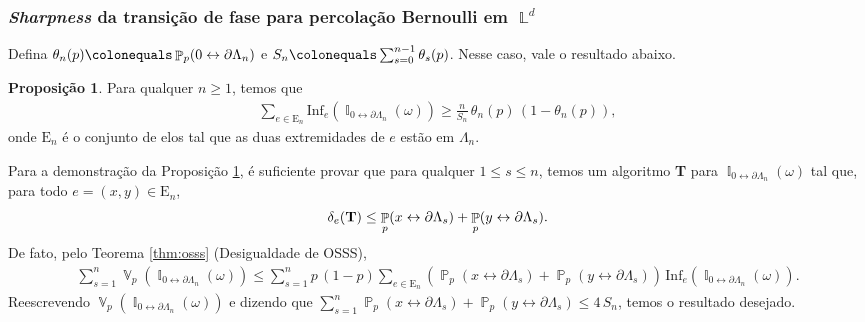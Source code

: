 \documentclass[9pt]{beamer}
\theoremstyle{definition} %
\newtheorem{mypro}{Proposição}
\DeclareMathOperator{\PX}{\mathbb{P}} %
\DeclareMathOperator{\VX}{\mathbb{V}} %
\DeclareMathOperator{\IX}{\mathbb{I}} %
\DeclareMathOperator{\LX}{\mathbb{L}} %
\begin{document}
	\begin{frame}[t]
		\frametitle{\textit{Sharpness} da transição de fase para percolação Bernoulli em $\LX^d$}
		Defina $\theta_n(p) \colonequals \PX_p(0 \leftrightarrow \partial\Lambda_n)$ e $S_n \colonequals \sum_{s = 0}^{n-1}\theta_s(p)$. Nesse caso, vale o resultado abaixo.
		\begin{mypro}\label{prop:decai-exp}
			Para qualquer $n \geq 1$, temos que
			\begin{align*}
			\sum_{e \in \text{E}_n} \text{Inf}_e(\IX_{0\leftrightarrow\partial\Lambda_n}(\omega)) \geq \frac{n}{S_n} \, \theta_n(p) \, (1 - \theta_n(p)),
			\end{align*}
			onde $\text{E}_n$ é o conjunto de elos tal que as duas extremidades de $e$ estão em $\Lambda_n$.
		\end{mypro}
		\vspace{-3pt}
%				
			Para a demonstração da Proposição \ref{prop:decai-exp}, é suficiente provar que para qualquer $1 \leq s \leq n$, temos um algoritmo \textbf{T} para $\IX_{0\leftrightarrow\partial\Lambda_n}(\omega)$ tal que, para todo $e = (x, y) \in \text{E}_n$,
			\begin{align*}
				\delta_e(\text{\textbf{T}}) \leq \PX_p(x \leftrightarrow \partial\Lambda_s) + \PX_p(y \leftrightarrow \partial\Lambda_s).
			\end{align*} \pause
			De fato, pelo Teorema \ref{thm:osss} (Desigualdade de OSSS), 
			\begin{align*}
			\sum_{s = 1}^n\VX_p(\IX_{0 \leftrightarrow \partial\Lambda_n}(\omega)) \leq \sum_{s = 1}^n p\,(1-p) \sum_{e \in \text{E}_n}(\PX_p(x \leftrightarrow \partial\Lambda_s) + \PX_p(y \leftrightarrow \partial\Lambda_s)) \, \text{Inf}_e(\IX_{0 \leftrightarrow \partial\Lambda_n}(\omega)).
			\end{align*}
			Reescrevendo $\VX_p(\IX_{0 \leftrightarrow \partial\Lambda_n}(\omega))$ e dizendo que $\sum_{s = 1}^n \PX_p(x \leftrightarrow \partial\Lambda_s) + \PX_p(y \leftrightarrow \partial\Lambda_s) \leq 4\, S_n$, temos o resultado desejado.
	\end{frame}
\end{document}
